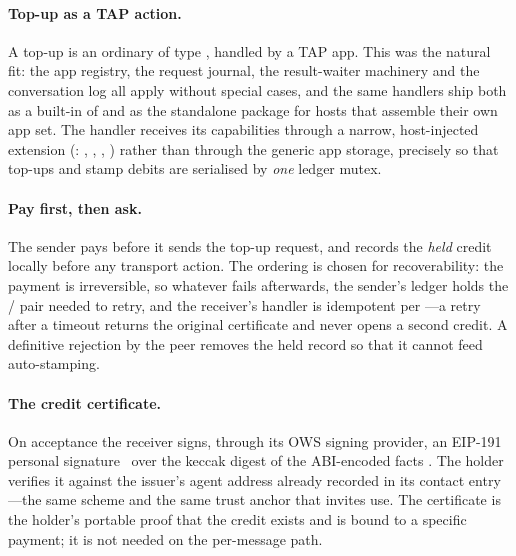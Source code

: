 \paragraph{Top-up as a TAP action.}
A top-up is an ordinary  of type , handled by a
TAP app. This was the natural fit: the app registry, the request journal, the
result-waiter machinery and the conversation log all apply without special cases, and the
same handlers ship both as a built-in of  and as the standalone package
 for hosts that assemble their own app set. The handler
receives its capabilities through a narrow, host-injected extension
(: , ,
, ) rather than through the generic app storage,
precisely so that top-ups and stamp debits are serialised by \emph{one} ledger mutex.

\paragraph{Pay first, then ask.}
The sender pays before it sends the top-up request, and records the \emph{held} credit
locally before any transport action. The ordering is chosen for recoverability: the
payment is irreversible, so whatever fails afterwards, the sender's ledger holds the
/ pair needed to retry, and the receiver's handler is
idempotent per ---a retry after a timeout returns the original
certificate and never opens a second credit. A definitive rejection by the peer removes
the held record so that it cannot feed auto-stamping.

\paragraph{The credit certificate.}
On acceptance the receiver signs, through its OWS signing provider, an EIP-191 personal
signature~\cite{eip191} over the keccak digest of the ABI-encoded facts
. The
holder verifies it against the issuer's agent address already recorded in its contact
entry---the same scheme and the same trust anchor that invites use. The certificate is the
holder's portable proof that the credit exists and is bound to a specific payment; it is
not needed on the per-message path.

